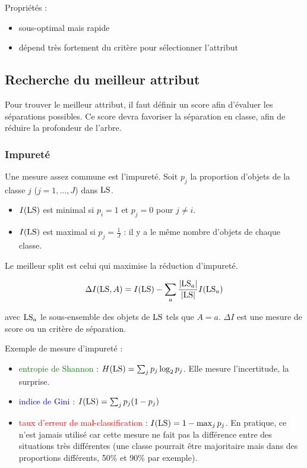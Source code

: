 	Propriétés : 
	
	\begin{itemize}
		\item sous-optimal mais rapide
		\item dépend très fortement du critère pour sélectionner l'attribut
	\end{itemize}
	
	\subsection{Recherche du meilleur attribut}
	
	Pour trouver le meilleur attribut, il faut définir un score afin d'évaluer les séparations possibles. Ce score devra favoriser la séparation en classe, afin de réduire la profondeur de l'arbre.
	
	
		\subsubsection{Impureté}
		
		Une mesure assez commune est l'impureté. Soit $p_j$ la proportion d'objets de la classe $j$ ($j = 1, \dots , J$) dans $\text{LS}$.
		
		\begin{itemize}
			\item $I(\text{LS})$ est minimal si $p_i = 1$ et $p_j = 0$ pour $j \neq i$.
			\item $I(\text{LS})$ est maximal si $p_j = \frac{1}{J}$ : il y a le même nombre d'objets de chaque classe.
		\end{itemize}
		
		Le meilleur split est celui qui maximise la réduction d'impureté.
		
		$$\Delta I(\text{LS}, A) = I(\text{LS}) - \sum_a \frac{\vert \text{LS}_a \vert}{\vert \text{LS} \vert} I(\text{LS}_a)$$
		
		avec $\text{LS}_a$ le sous-ensemble des objets de $\text{LS}$ tels que $A = a$. $\Delta I$ est une mesure de score ou un critère de séparation.
		
		
		
		Exemple de mesure d'impureté :
		
		\begin{itemize}
			\item \textcolor{green}{entropie de Shannon} : $H(\text{LS}) = \sum_j p_j \log_2 p_j$. Elle mesure l'incertitude, la surprise.
			
			\item \textcolor{blue}{indice de Gini} : $I(\text{LS}) = \sum_j p_j(1 - p_j)$
			\item \textcolor{red}{taux d'erreur de mal-classification} : $I(\text{LS}) = 1 - \max_j p_j$. En pratique, ce n'est jamais utilisé car cette mesure ne fait pas la différence entre des situations très différentes (une classe pourrait être majoritaire mais dans des proportions différents, 50\% et 90\% par exemple).
			
		\end{itemize}
		

